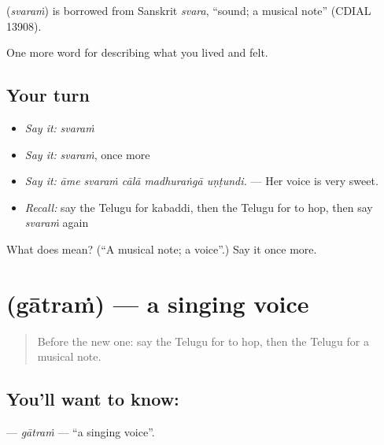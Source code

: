\begin{cousinweb}
\textbf{} (\emph{svaraṁ}) is borrowed from Sanskrit \emph{svara}, \textquotedblleft{}sound; a musical note\textquotedblright{} (CDIAL 13908).
\end{cousinweb}

\begin{grammarlens}[title={What you've built}]
One more word for describing what you lived and felt.
\end{grammarlens}

\subsection*{Your turn}
\begin{itemize}
\raggedright
  \item \emph{Say it:} \emph{svaraṁ}
  \item \emph{Say it:} \emph{svaraṁ}, once more
  \item \emph{Say it:} \emph{āme svaraṁ cālā madhuraṅgā uṇṭundi.} — Her voice is very sweet.
  \item \emph{Recall:} say the Telugu for kabaddi, then the Telugu for to hop, then say \emph{svaraṁ} again
\end{itemize}

\begin{tcolorbox}[breakable,colback=teal!4,colframe=teal!35!black,title={Before you move on}]
What does  mean? (\textquotedblleft{}A musical note; a voice\textquotedblright{}.) Say it once more.
\end{tcolorbox}
\section[\texorpdfstring{\te{గాత్రం} (gātraṁ)}{గాత్రం (gātraṁ)}]{ (gātraṁ) — a singing voice}

\label{lesson:TE-C538-gatram}



\begin{quote}
Before the new one: say the Telugu for to hop, then the Telugu for a musical note.
\end{quote}

\subsection*{You'll want to know: }
\textbf{} — \emph{gātraṁ} — \textquotedblleft{}a singing voice\textquotedblright{}.

